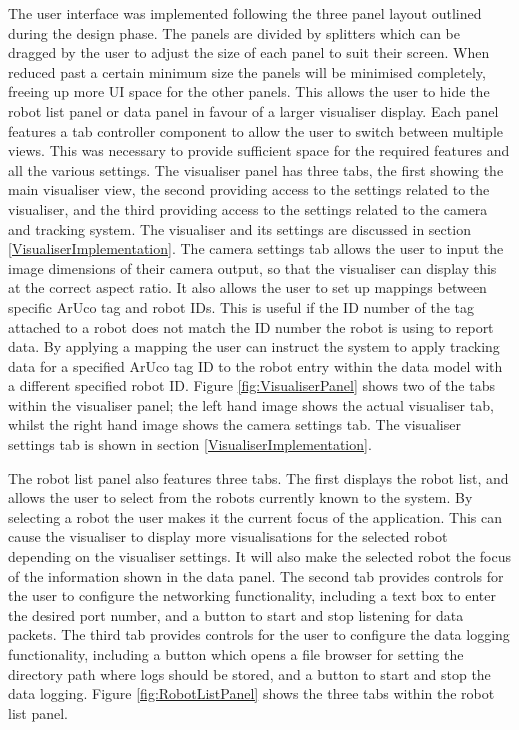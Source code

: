 The user interface was implemented following the three panel layout outlined during the design phase. The panels are divided by splitters which can be dragged by the user to adjust the size of each panel to suit their screen. When reduced past a certain minimum size the panels will be minimised completely, freeing up more UI space for the other panels. This allows the user to hide the robot list panel or data panel in favour of a larger visualiser display. Each panel features a tab controller component to allow the user to switch between multiple views. This was necessary to provide sufficient space for the required features and all the various settings. The visualiser panel has three tabs, the first showing the main visualiser view, the second providing access to the settings related to the visualiser, and the third providing access to the settings related to the camera and tracking system. The visualiser and its settings are discussed in section \ref{VisualiserImplementation}. The camera settings tab allows the user to input the image dimensions of their camera output, so that the visualiser can display this at the correct aspect ratio. It also allows the user to set up mappings between specific ArUco tag and robot IDs. This is useful if the ID number of the tag attached to a robot does not match the ID number the robot is using to report data. By applying a mapping the user can instruct the system to apply tracking data for a specified ArUco tag ID to the robot entry within the data model with a different specified robot ID. Figure \ref{fig:VisualiserPanel} shows two of the tabs within the visualiser panel; the left hand image shows the actual visualiser tab, whilst the right hand image shows the camera settings tab. The visualiser settings tab is shown in section \ref{VisualiserImplementation}.

The robot list panel also features three tabs. The first displays the robot list, and allows the user to select from the robots currently known to the system. By selecting a robot the user makes it the current focus of the application. This can cause the visualiser to display more visualisations for the selected robot depending on the visualiser settings. It will also make the selected robot the focus of the information shown in the data panel. The second tab provides controls for the user to configure the networking functionality, including a text box to enter the desired port number, and a button to start and stop listening for data packets. The third tab provides controls for the user to configure the data logging functionality, including a button which opens a file browser for setting the directory path where logs should be stored, and a button to start and stop the data logging. Figure \ref{fig:RobotListPanel} shows the three tabs within the robot list panel.

